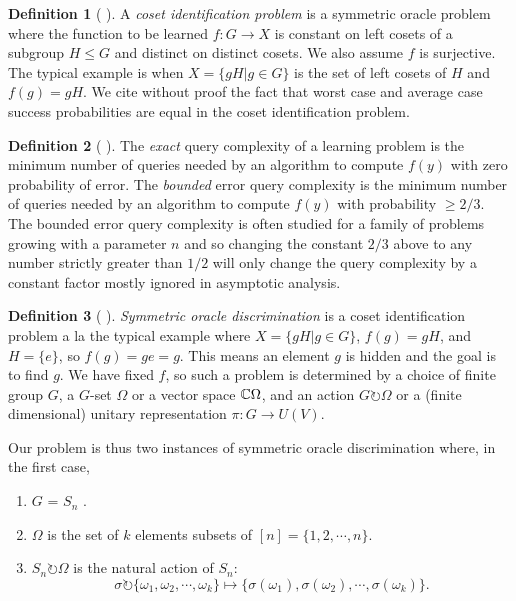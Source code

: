 \documentclass[12pt,twoside]{reedthesis}
\theoremstyle{plain}   %
\theoremstyle{definition}
\newtheorem{defn}{Definition}[section]
\theoremstyle{remark}
\numberwithin{equation}{section}
\def\acts{\circlearrowright} %
\begin{document}
  \begin{defn}[{ \cite[Section 2]{copeland} }]
    A \emph{coset identification problem} is a symmetric oracle problem where
    the function to be learned $f: G \to X$ is constant on left cosets of a subgroup $H \leq G$ and distinct on distinct cosets.
    We also assume $f$ is surjective.
    The typical example is when $X = \{gH | g \in G\}$ is the set of left cosets of $H$ and $f(g) = gH$.
    We cite without proof the fact that worst case and average case success probabilities are equal in the coset identification problem.
  \end{defn}
  \begin{defn}[{ \cite[Section 2]{copeland} }]
    The \emph{exact}
    query complexity of a learning problem is the minimum number of queries needed by an algorithm
    to compute $f (y)$ with zero probability of error. The \emph{bounded} error query complexity is the minimum
    number of queries needed by an algorithm to compute $f (y)$ with probability $\geq 2/3$. The bounded
    error query complexity is often studied for a family of problems growing with a parameter $n$ and
    so changing the constant $2/3$ above to any number strictly greater than $1/2$ will only change the
    query complexity by a constant factor mostly ignored in asymptotic analysis.
  \end{defn}
  \begin{defn}[{ \cite[Section 4]{copeland} }]
    \emph{Symmetric oracle discrimination} is a coset identification problem a la the typical example where $X = \{gH | g \in G\}$, $f(g) = gH$, and $H = \{e\}$, so $f(g) = g e = g$.
    This means an element $g$ is hidden and the goal is to find $g$.
    We have fixed $f$, so such a problem is determined by a choice of finite group $G$, a $G$-set $\Omega$ or a vector space $\mathbb{C} \Omega$, and an action $G \acts \Omega$ or a (finite dimensional) unitary representation $\pi: G \to U(V)$.
  \end{defn}
  Our problem is thus two instances of symmetric oracle discrimination where, in the first case,
  \begin{enumerate}
  \item $G$ = $S_n$ .
  \item $\Omega$ is the set of $k$ elements subsets of $[n] = \{ 1, 2, \cdots, n\}$.
  \item $S_n \acts \Omega$ is the natural action of $S_n$:
    \[\sigma \acts \{ \omega_1, \omega_2, \cdots, \omega_k \} \mapsto \{ \sigma(\omega_1), \sigma(\omega_2), \cdots, \sigma(\omega_k)\}.\]
  \end{enumerate}
\end{document}
